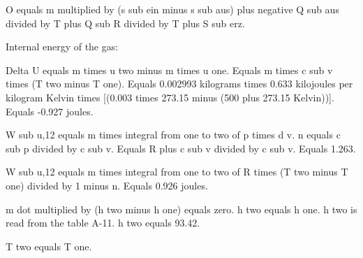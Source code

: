 O equals m multiplied by (s sub ein minus s sub aus) plus negative Q sub aus divided by T plus Q sub R divided by T plus S sub erz.

Internal energy of the gas:  

Delta U equals m times u two minus m times u one.  
Equals m times c sub v times (T two minus T one).  
Equals 0.002993 kilograms times 0.633 kilojoules per kilogram Kelvin times [(0.003 times 273.15 minus (500 plus 273.15 Kelvin))].  
Equals -0.927 joules.  

W sub u,12 equals m times integral from one to two of p times d v.  
n equals c sub p divided by c sub v.  
Equals R plus c sub v divided by c sub v.  
Equals 1.263.  

W sub u,12 equals m times integral from one to two of R times (T two minus T one) divided by 1 minus n.  
Equals 0.926 joules.

m dot multiplied by (h two minus h one) equals zero.  
h two equals h one.  
h two is read from the table A-11.  
h two equals 93.42.  

T two equals T one.
